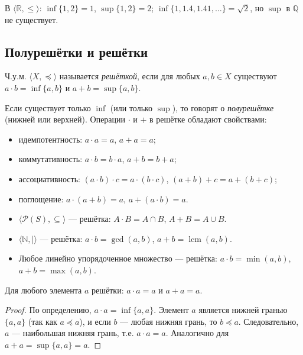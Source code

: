 \documentclass[10pt]{article}
\begin{document}
\begin{example}
В $\langle \mathbb{R}, \le \rangle$: $\inf\{1,2\}=1$, $\sup\{1,2\}=2$; $\inf\{1,1.4,1.41,\dots\}=\sqrt{2}$, но $\sup$ в $\mathbb{Q}$ не существует.
\end{example}

\subsection{Полурешётки и решётки}
\begin{definition}
Ч.у.м. $\langle X, \preceq \rangle$ называется \emph{решёткой}, если для любых $a,b\in X$ существуют $a\cdot b = \inf\{a,b\}$ и $a+b = \sup\{a,b\}$.
\end{definition}
Если существует только $\inf$ (или только $\sup$), то говорят о \emph{полурешётке} (нижней или верхней). Операции $\cdot$ и $+$ в решётке обладают свойствами:
\begin{itemize}
    \item идемпотентность: $a\cdot a = a$, $a+a = a$;
    \item коммутативность: $a\cdot b = b\cdot a$, $a+b = b+a$;
    \item ассоциативность: $(a\cdot b)\cdot c = a\cdot(b\cdot c)$, $(a+b)+c = a+(b+c)$;
    \item поглощение: $a\cdot(a+b)=a$, $a+(a\cdot b)=a$.
\end{itemize}

\begin{example}\;
\begin{itemize}
    \item $\langle \mathcal{P}(S), \subseteq \rangle$ — решётка: $A\cdot B = A\cap B$, $A+B = A\cup B$.
    \item $\langle \mathbb{N}, \mid \rangle$ — решётка: $a\cdot b = \gcd(a,b)$, $a+b = \operatorname{lcm}(a,b)$.
    \item Любое линейно упорядоченное множество — решётка: $a\cdot b = \min(a,b)$, $a+b = \max(a,b)$.
\end{itemize}
\end{example}

\begin{theorem}[Идемпотентность]
Для любого элемента $a$ решётки: $a \cdot a = a$ и $a + a = a$.
\end{theorem}
\begin{proof}
По определению, $a \cdot a = \inf\{a,a\}$. Элемент $a$ является нижней гранью $\{a,a\}$ (так как $a \preceq a$), и если $b$ — любая нижняя грань, то $b \preceq a$. Следовательно, $a$ — наибольшая нижняя грань, т.е. $a \cdot a = a$. Аналогично для $a + a = \sup\{a,a\} = a$.
\end{proof}
\end{document}
